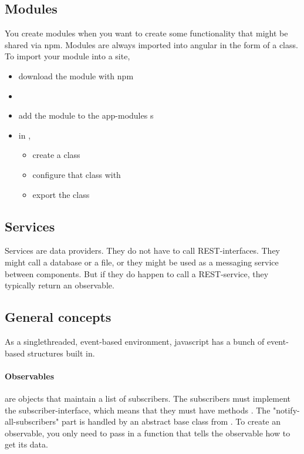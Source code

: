 \subsection{Modules}
You create modules when you want to create some functionality that might be shared via npm. 
Modules are always imported into angular in the form of a class. To import your module into a site, 
\begin{itemize}
    \item download the module with npm
    \item {}
    \item add the module to the app-modules s
    \item in , 
        \begin{itemize}
            \item create a class 
            \item configure that class with 
            \item export the class
        \end{itemize}
\end{itemize}


\subsection{Services}
Services are data providers. They do not have to call REST-interfaces. They might call a database or a file, or they might be used as a messaging service between components. But if they do happen to call a REST-service, they typically return an observable.


\subsection{General concepts}

As a singlethreaded, event-based environment, javascript has a bunch of event-based structures built in.

\paragraph{Observables} are objects that maintain a list of subscribers. The subscribers must implement the subscriber-interface, which means that they must have methods .
The "notify-all-subscribers" part is handled by an abstract base class from . To create an observable, you only need to pass in a function that tells the observable how to  get its data.


